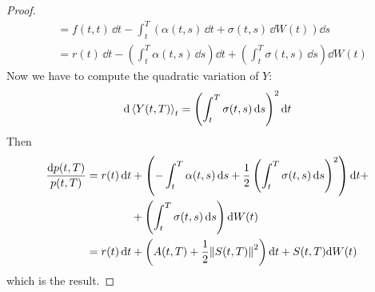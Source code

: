 \begin{proof}
\begin{align*}
        &=
        f(t,t)\,\dd t - \int_t^T (\alpha(t,s)\,\dd t + \sigma(t,s)\,\dd W(t))\dd s \\
        &=
        r(t)\,\dd t - \left(\int_t^T \alpha(t,s)\,\dd s\right)\dd t + \left(\int_t^T \sigma(t,s)\,\dd s\right)\dd W(t)
    \end{align*}
    Now we have to compute the quadratic variation of $Y$:
    \begin{align*}
        \dd\expval{Y(t,T)}_t = \left(\int_t^T \sigma(t,s)\,\dd s\right)^2\dd t
    \end{align*}
    Then
    \begin{align*}
        \frac{\dd p(t,T)}{p(t,T)} &= r(t)\,\dd t + \left(- \int_t^T \alpha(t,s)\,\dd s + \frac{1}{2}\left(\int_t^T \sigma(t,s)\,\dd s\right)^2\right)\dd t + \\
        &\qquad\qquad
        + \left(\int_t^T \sigma(t,s)\,\dd s\right)\dd W(t) \\
        &=
        r(t)\,\dd t + \left(A(t,T) + \frac{1}{2}\norm{S(t,T)}^2\right)\dd t + S(t,T)\dd W(t)
    \end{align*}
    which is the result.
\end{proof}

